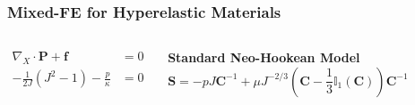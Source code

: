 \documentclass[aspectratio=169,xcolor=dvipsnames]{beamer}
\newcommand{\bm}{\boldsymbol}
\begin{document}

\begin{frame}
\frametitle{Mixed-FE for Hyperelastic Materials}
\begin{columns}[c] 
    {\Large
    \begin{align}
        \nabla_X \cdot \bm{P} + \bm{f} &= 0 \nonumber \\
        -\frac{1}{2 J} \left(J^2 - 1 \right) - \frac{p}{\kappa} &= 0 \nonumber
    \end{align}
    }

    \textbf{Standard Neo-Hookean Model}
    \begin{equation}
        \bm{S} = -p J \bm{C}^{-1} + \mu J^{-2/3} \left(\bm{C} - \frac{1}{3} \mathbb{{I}}_1(\bm{C}) \right) \bm{C}^{-1} \nonumber 
    \end{equation}

    \end{columns}
\end{frame}

\end{document}
